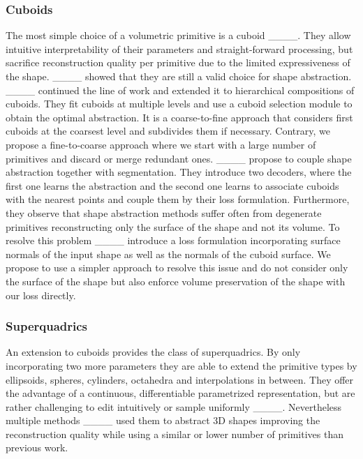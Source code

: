 \subsubsection{Cuboids} 
The most simple choice of a volumetric primitive is a cuboid ____. 
They allow intuitive interpretability of their parameters and straight-forward processing, but sacrifice reconstruction quality per primitive due to the limited expressiveness of the shape.
____ showed that they are still a valid choice for shape abstraction.
____ continued the line of work and extended it to hierarchical compositions of cuboids. 
They fit cuboids at multiple levels and use a cuboid selection module to obtain the optimal abstraction.
It is a coarse-to-fine approach that considers first cuboids at the coarsest level and subdivides them if necessary.
Contrary, we propose a fine-to-coarse approach where we start with a large number of primitives and discard or merge redundant ones. 
____ propose to couple shape abstraction together with segmentation.
They introduce two decoders, where the first one learns the abstraction and the second one learns to associate cuboids with the nearest points and couple them by their loss formulation.
Furthermore, they observe that shape abstraction methods suffer often from degenerate primitives reconstructing only the surface of the shape and not its volume.
To resolve this problem ____ introduce a loss formulation incorporating surface normals of the input shape as well as the normals of the cuboid surface.
We propose to use a simpler approach to resolve this issue and do not consider only the surface of the shape but also enforce volume preservation of the shape with our loss directly.

\subsubsection{Superquadrics} 
An extension to cuboids provides the class of superquadrics. 
By only incorporating two more parameters they are able to extend the primitive types by ellipsoids, spheres, cylinders, octahedra and interpolations in between. 
They offer the advantage of a continuous, differentiable parametrized representation, but are rather challenging to edit intuitively or sample uniformly ____.
Nevertheless multiple methods ____ used them to abstract 3D shapes improving the reconstruction quality while using a similar or lower number of primitives than previous work.

